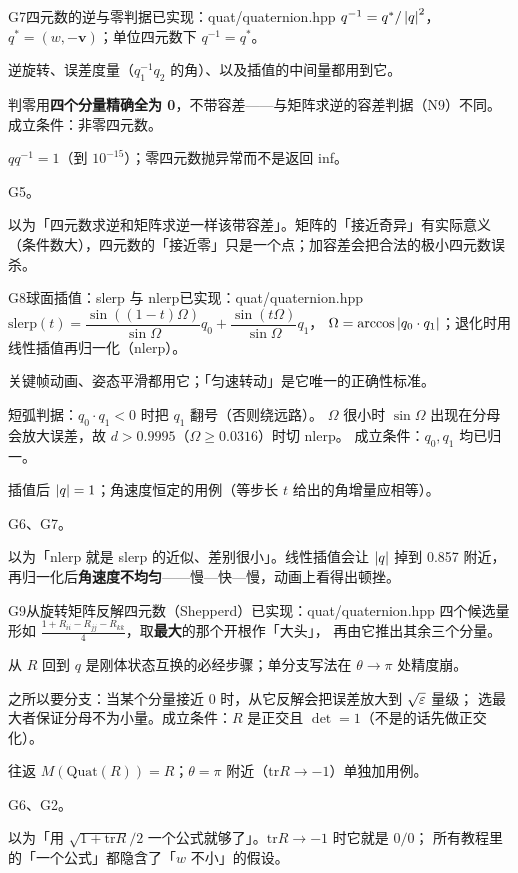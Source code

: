 \begin{know}{G7}{四元数的逆与零判据}{已实现：quat/quaternion.hpp}
 $q^{-1}=q^{*}/\left\lvert q\right\rvert^{2}$，$q^{*}=(w,-\mathbf v)$；单位四元数下 $q^{-1}=q^{*}$。

 逆旋转、误差度量（$q_1^{-1}q_2$ 的角）、以及插值的中间量都用到它。

 判零用\textbf{四个分量精确全为 0}，不带容差——与矩阵求逆的容差判据（N9）不同。
成立条件：非零四元数。

 $qq^{-1}=1$（到 $10^{-15}$）；零四元数抛异常而不是返回 inf。

 G5。

 以为「四元数求逆和矩阵求逆一样该带容差」。矩阵的「接近奇异」有实际意义
（条件数大），四元数的「接近零」只是一个点；加容差会把合法的极小四元数误杀。
\end{know}

\begin{know}{G8}{球面插值：slerp 与 nlerp}{已实现：quat/quaternion.hpp}
 $\mathrm{slerp}(t)=\dfrac{\sin((1-t)\Omega)}{\sin\Omega}q_0+\dfrac{\sin(t\Omega)}{\sin\Omega}q_1$，
$\Omega=\arccos\left\lvert q_0\cdot q_1\right\rvert$；退化时用线性插值再归一化（nlerp）。

 关键帧动画、姿态平滑都用它；「匀速转动」是它唯一的正确性标准。

 短弧判据：$q_0\cdot q_1<0$ 时把 $q_1$ 翻号（否则绕远路）。
$\Omega$ 很小时 $\sin\Omega$ 出现在分母会放大误差，故 $d>0.9995$（$\Omega\ge0.0316$）时切 nlerp。
成立条件：$q_0,q_1$ 均已归一。

 插值后 $\left\lvert q\right\rvert=1$；角速度恒定的用例（等步长 $t$ 给出的角增量应相等）。

 G6、G7。

 以为「nlerp 就是 slerp 的近似、差别很小」。线性插值会让 $\left\lvert q\right\rvert$ 掉到 0.857 附近，
再归一化后\textbf{角速度不均匀}——慢—快—慢，动画上看得出顿挫。
\end{know}

\begin{know}{G9}{从旋转矩阵反解四元数（Shepperd）}{已实现：quat/quaternion.hpp}
 四个候选量形如 $\frac{1+R_{ii}-R_{jj}-R_{kk}}{4}$，取\textbf{最大}的那个开根作「大头」，
再由它推出其余三个分量。

 从 $R$ 回到 $q$ 是刚体状态互换的必经步骤；单分支写法在 $\theta\to\pi$ 处精度崩。

 之所以要分支：当某个分量接近 0 时，从它反解会把误差放大到 $\sqrt{\varepsilon}$ 量级；
选最大者保证分母不为小量。成立条件：$R$ 是正交且 $\det=1$（不是的话先做正交化）。

 往返 $M(\mathrm{Quat}(R))=R$；$\theta=\pi$ 附近（$\mathrm{tr}R\to-1$）单独加用例。

 G6、G2。

 以为「用 $\sqrt{1+\mathrm{tr}R}/2$ 一个公式就够了」。$\mathrm{tr}R\to-1$ 时它就是 $0/0$；
所有教程里的「一个公式」都隐含了「$w$ 不小」的假设。
\end{know}

